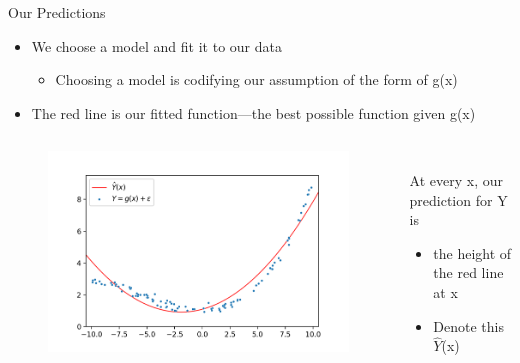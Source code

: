 \documentclass[aspectratio=169]{../latex_main/tntbeamer}  %
\begin{document}
	
	\begin{frame}{Our Predictions}
	    \begin{itemize}
	        \item We choose a model and fit it to our data
	        \begin{itemize}
	            \item Choosing a model is codifying our assumption of the form of g(x)
	        \end{itemize}
	        \item The red line is our fitted function—the best possible function given g(x)
	    \end{itemize}
	    \begin{columns}
	        \begin{column}{.4\textwidth}
	                \begin{figure}
	                    \includegraphics[scale=.5]{Bild3}
	                \end{figure}
	        \end{column}
	        
	        
	         \begin{column}{.4\textwidth}
	         \\ \bigskip
	         \bigskip
	               At every x, our prediction for Y is
	                \begin{itemize}
	                    \item the height of the red line at x
	                    \item Denote this  $\hat{Y}$(x)
	                \end{itemize}
	        \end{column}
	    \end{columns}
	\end{frame}
\end{document}
